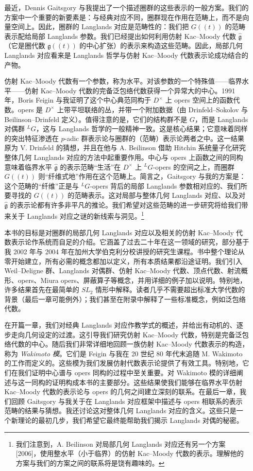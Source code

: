 最近，Dennis Gaitsgory 与我提出了一个描述圈群的这些表示的一般方案。我们的方案中一个重要的新要素是：与经典对应不同，圈群现在作用在范畴上，而不是向量空间上。因此，圈群的 Langlands 对应是范畴性的：我们把 $G(\!(t)\!)$ 的范畴表示配给局部 Langlands 参数。我们已经提出如何利用仿射 Kac--Moody 代数 $\hat{\mathfrak{g}}$（它是圈代数 $\mathfrak{g}(\!(t)\!)$ 的中心扩张）的表示来构造这些范畴。因此，局部几何 Langlands 对应看来是 Langlands 哲学与仿射 Kac--Moody 代数表示论成功结合的产物。

仿射 Kac--Moody 代数有一个参数，称为水平。对该参数的一个特殊值——临界水平——仿射 Kac--Moody 代数的完备泛包络代数获得一个异常大的中心。1991 年，Boris Feigin 与我证明了这个中心典范同构于 $D^\times$ 上 opers 空间上的函数代数。opers 是 $D^\times$ 上带平坦联络的丛，并带一个附加数据（由 Drinfeld--Sokolov 与 Beilinson--Drinfeld 定义）。值得注意的是，它们的结构群不是 $G$，而是 Langlands 对偶群 ${}^L G$，这与 Langlands 哲学的一般精神一致。这是核心结果；它意味着同样的突出特征渗透在 $p$-adic 群表示论与圈群的（范畴）表示论两者之中。这一结果原为 V. Drinfeld 的猜想，并且在他与 A. Beilinson 借助 Hitchin 系统量子化研究整体几何 Langlands 对应的方法中起重要作用。中心与 opers 上函数之间的同构意味着临界水平 $\hat{\mathfrak{g}}$ 的表示范畴“生活”在 $D^\times$ 上 ${}^L G$-opers 的空间之上，而圈群 $G(\!(t)\!)$ 则“纤维式地”作用在这个范畴上。简言之，Gaitsgory 与我的方案是：这个范畴的“纤维”正是与 ${}^L G$-opers 背后的局部 Langlands 参数相对应的、我们所要寻找的 $G(\!(t)\!)$ 的范畴表示。这对局部与整体几何 Langlands 对应、以及对 $\hat{\mathfrak{g}}$ 的表示论都有许多非平凡的推论。我们希望对这些范畴的进一步研究将给我们带来关于 Langlands 对应之谜的新线索与洞见。\footnote{我们注意到，A. Beilinson 对局部几何 Langlands 对应还有另一个方案 [2006]，使用整水平（小于临界）的仿射 Kac--Moody 代数的表示。理解他的方案与我们的方案之间的联系将是饶有趣味的。}

本书的目标是对圈群的局部几何 Langlands 对应以及相关的仿射 Kac--Moody 代数表示论作系统而自足的介绍。它涵盖了过去二十年在这一领域的研究，部分基于我 2002 年与 2004 年在加州大学伯克利分校讲授的研究生课程。书中整个理论从零开始建立，所有必需的概念都加以定义，所有本质结果都沿途证明。我们引入 Weil--Deligne 群、Langlands 对偶群、仿射 Kac--Moody 代数、顶点代数、射流概形、opers、Miura opers、屏蔽算子等概念，并用详细的例子加以说明。特别地，许多结果首先在最简单的 $SL_2$ 情形中解释。读者几乎不需要超出标准大学代数的背景（最后一章可能例外）；我们甚至在附录中解释了一些标准概念，例如泛包络代数。

在开篇一章，我们对经典 Langlands 对应作教学式的概述，并给出有动机的、逐步走向几何设定的过渡。这引导我们研究仿射 Kac--Moody 代数，特别是完备泛包络代数的中心。随后我们非常详细地回顾一族仿射 Kac--Moody 代数表示的构造，称为 \emph{Wakimoto 模}。它们是 Feigin 与我在 20 世纪 80 年代末追随 M. Wakimoto 的工作而定义的。这些模为我们发展仿射代数表示论提供了有效工具。特别地，它们在我们证明中心谱与 opers 同构的过程中至关重要。对 Wakimoto 模的详细阐述与这一同构的证明构成本书的主要部分。这些结果使我们能够在临界水平仿射 Kac--Moody 代数的表示论与 opers 的几何之间建立深刻的联系。在最后一章，我们回顾 Gaitsgory 与我关于在 Langlands 对应框架中描述与 opers 相联系的表示范畴的结果与猜想。我还讨论这对整体几何 Langlands 对应的含义。这些只是一个新理论的最初几步，我们希望它最终能帮助我们揭示 Langlands 对偶的秘密。

